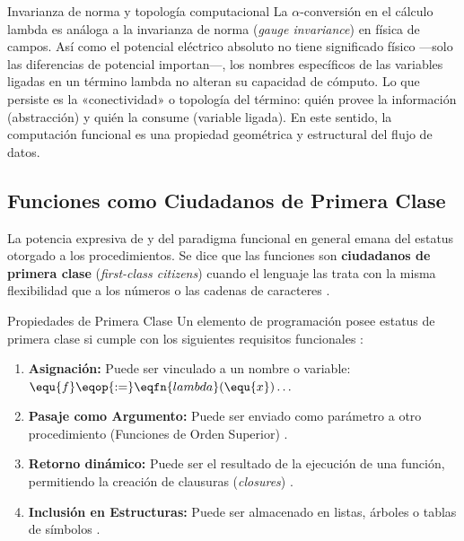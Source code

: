 \begin{fisicaconexion}{Invarianza de norma y topología computacional}
La $\alpha$-conversión en el cálculo lambda es análoga a la invarianza de norma (\textit{gauge invariance}) en física de campos. Así como el potencial eléctrico absoluto no tiene significado físico —solo las diferencias de potencial importan—, los nombres específicos de las variables ligadas en un término lambda no alteran su capacidad de cómputo. Lo que persiste es la «conectividad» o topología del término: quién provee la información (abstracción) y quién la consume (variable ligada). En este sentido, la computación funcional es una propiedad geométrica y estructural del flujo de datos.
\end{fisicaconexion}

\subsection{Funciones como Ciudadanos de Primera Clase}
\label{subsec:4_1_4_ciudadanos_primera_clase}

La potencia expresiva de  y del paradigma funcional en general emana del estatus otorgado a los procedimientos. Se dice que las funciones son \textbf{ciudadanos de primera clase} (\textit{first-class citizens}) cuando el lenguaje las trata con la misma flexibilidad que a los números o las cadenas de caracteres \cite{SICP, PFPL}.

\begin{definicion}{Propiedades de Primera Clase}
Un elemento de programación posee estatus de primera clase si cumple con los siguientes requisitos funcionales \cite{SICP}:
\begin{enumerate}
    \item \textbf{Asignación:} Puede ser vinculado a un nombre o variable: $\equ{f} \eqop{:=} \eqfn{lambda}(\equ{x}) \dots$
    \item \textbf{Pasaje como Argumento:} Puede ser enviado como parámetro a otro procedimiento (Funciones de Orden Superior) \cite{SICP}.
    \item \textbf{Retorno dinámico:} Puede ser el resultado de la ejecución de una función, permitiendo la creación de clausuras (\textit{closures}) \cite{TAPL, PFPL}.
    \item \textbf{Inclusión en Estructuras:} Puede ser almacenado en listas, árboles o tablas de símbolos \cite{SICP}.
\end{enumerate}
\end{definicion}


